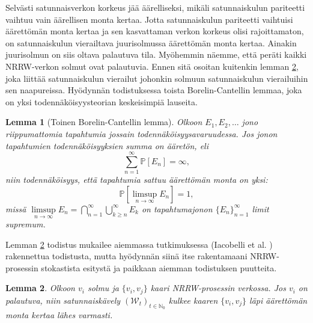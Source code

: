 \documentclass[finnish, 12pt, a4paper, sci, utf8, pdfa]{aaltothesis}
\newcommand{\N}{\mathbb{N}}
\newcommand{\Wrandom}{\mathcal{W}}
\newcommand*{\prob}{\mathbb{P}}
\newtheorem{lemma}{Lemma}
\begin{document}
Selvästi satunnaisverkon korkeus jää äärelliseksi, mikäli satunnaiskulun pariteetti vaihtuu vain äärellisen monta kertaa. Jotta satunnaiskulun pariteetti vaihtuisi äärettömän monta kertaa
ja sen kasvattaman verkon korkeus olisi rajoittamaton, on satunnaiskulun vierailtava juurisolmussa äärettömän monta kertaa. Ainakin juurisolmun on siis oltava palautuva tila. Myöhemmin
näemme, että peräti kaikki NRRW-verkon solmut ovat palautuvia. Ennen sitä osoitan kuitenkin lemman \ref{lemma:recurrence}, joka liittää satunnaiskulun vierailut johonkin solmuun 
satunnaiskulun vierailuihin sen naapureissa. Hyödynnän todistuksessa toista Borelin-Cantellin lemmaa, joka on yksi todennäköisyysteorian keskeisimpiä lauseita.
\begin{lemma}[Toinen Borelin-Cantellin lemma]
   Olkoon $ E_{1}, E_{2}, \ldots $ jono riippumattomia tapahtumia jossain todennäköisyysavaruudessa. Jos jonon tapahtumien todennäköisyyksien summa on ääretön, eli
   \[
      \sum_{n = 1}^{\infty} \prob \left[ E_{n} \right] = \infty,
   \]
   niin todennäköisyys, että tapahtumia sattuu äärettömän monta on yksi:
   \[
      \prob \left[ \limsup \limits_{n \rightarrow \infty} E_{n} \right] = 1,
   \]
   missä $ \limsup \limits_{n \rightarrow \infty} E_{n} = \bigcap_{n = 1}^{\infty} \bigcup_{k \geq n}^{\infty} E_{k} $ on tapahtumajonon $ \{ E_{n} \}_{n=1}^{\infty} $ limit supremum. 
\label{lemma:borel-cantelli}
\end{lemma}

Lemman \ref{lemma:recurrence} todistus mukailee aiemmassa tutkimuksessa (Iacobelli et al. \cite{Iacobelli}) rakennettua todistusta, mutta hyödynnän siinä itse rakentamaani NRRW-prosessin 
stokastista esitystä ja paikkaan aiemman todistuksen puutteita.
\begin{lemma}
Olkoon $ v_{i} $ solmu ja $ \{v_{i}, v_{j}\} $ kaari NRRW-prosessin verkossa. Jos $ v_{i} $ on palautuva, niin satunnaiskävely $ (\Wrandom_{t})_{t \in \N_{0}} $ kulkee kaaren $ \{v_{i}, v_{j}\} $ läpi äärettömän monta kertaa lähes varmasti.
\label{lemma:recurrence}
\end{lemma}
\end{document}
